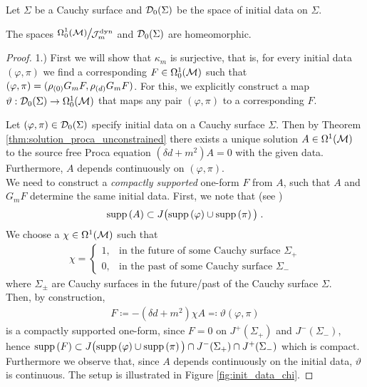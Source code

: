 \begin{lemma}\label{lem:one-particle-homeomorphism}
	Let $\Sigma$ be a Cauchy surface and $\mathcal{D}_{0}(\Sigma)$ be the space of initial data on $\Sigma$.
	\begin{center}
	The spaces ${\Quotientscale{\Omega^1_0(\M)}{\JMDYN}}$ and $\mathcal{D}_{0}(\Sigma)$ are homeomorphic.
	\end{center}
\end{lemma}
\begin{proof}
1.) First we will show that $\kappa_m$ is surjective, that is, for every initial data $(\varphi, \pi)$ we find a corresponding $F \in \Omega_0^1(\mathcal{M})$ such that $(\varphi , \pi) = (\rho_{(0)} G_m F , \rho_{(d)} G_m F)$.
For this, we explicitly construct a map $\vartheta : \mathcal{D}_{0}(\Sigma) \to \Omega^1_0(\mathcal{M})$ that maps any pair $(\varphi , \pi)$ to a corresponding $F$.\par
Let $(\varphi,\pi) \in \mathcal{D}_{0}(\Sigma)$ specify initial data on a Cauchy surface $\Sigma$. Then by Theorem \ref{thm:solution_proca_unconstrained} there exists a unique solution $A \in \Omega^1(\mathcal{M})$ to the source free Proca equation $(\delta d + m^2) A = 0$ with the given data. Furthermore, $A$ depends continuously on $(\varphi,\pi)$.\\
We need to construct a \emph{compactly supported} one-form $F$ from $A$, such that $A$ and $G_mF$ determine the same initial data. First, we note that (see \cite[Theorem 3.2.11]{baer_ginoux_pfaeffle})
\begin{align}
	\text{\upshape{supp}}\left(A\right) \subset J\big( \text{\upshape{supp}}\left(\varphi\right) \cup \text{\upshape{supp}}\left(\pi\right) \big) \;.
\end{align}
We choose a $\chi \in \Omega^1(\mathcal{M})$ such that
\begin{align}
	\chi =
	\begin{cases}
	1 , &\text{in the future of some Cauchy surface } \Sigma_+ \\
	0 , &\text{in the past of some Cauchy surface } \Sigma_-
	\end{cases}
\end{align}
where $\Sigma_\pm$ are Cauchy surfaces in the future/past of the Cauchy surface $\Sigma$.\\
Then, by construction,
\begin{align}
	F \coloneqq -(\delta d + m^2) \chi A \eqqcolon \vartheta(\varphi,\pi)
\end{align}
is a compactly supported one-form, since $F = 0$ on $J^+(\Sigma_+)$ and $J^-(\Sigma_-)$, hence $\text{\upshape{supp}}\left(F\right) \subset J\big( \text{\upshape{supp}}\left(\varphi\right) \cup \text{\upshape{supp}}\left(\pi\right)\big) \cap  J^-(\Sigma_+) \cap J^+(\Sigma_-)$ which is compact. Furthermore we observe that, since $A$ depends continuously on the initial data, $\vartheta$ is continuous. The setup is illustrated in Figure \ref{fig:init_data_chi}.

\end{proof}
